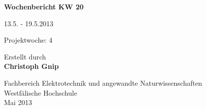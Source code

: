 
\begin{center}
{\Huge \textbf{Wochenbericht KW 20}\par}
\vspace{1cm}
{\Huge 13.5. - 19.5.2013\par}
\vspace{1cm}
{\Huge Projektwoche: 4\par}

\vspace{2cm}

\large{Erstellt durch}\\
\Large{\textbf{Christoph Gnip}}


\vfill

{\normalsize Fachbereich Elektrotechnik und angewandte Naturwissenschaften\\
Westfälische Hochschule\\[2ex]Mai 2013}


\end{center}
\newpage